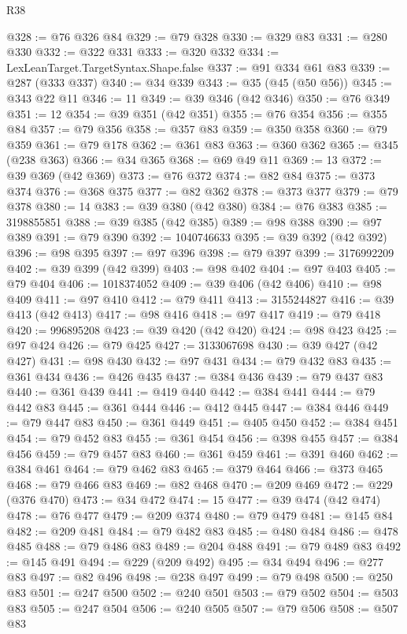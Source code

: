 \begin{lexlean}{R38}
\begin{coremodule}
@328 := @76 @326 @84
@329 := @79 @328
@330 := @329 @83
@331 := @280 @330
@332 := @322 @331
@333 := @320 @332
@334 := LexLeanTarget.TargetSyntax.Shape.false
@337 := @91 @334 @61 @83
@339 := @287 (@333 @337)
@340 := @34 @339
@343 := @35 (@45 (@50 @56))
@345 := @343 @22 @11
@346 := 11
@349 := @39 @346 (@42 @346)
@350 := @76 @349
@351 := 12
@354 := @39 @351 (@42 @351)
@355 := @76 @354
@356 := @355 @84
@357 := @79 @356
@358 := @357 @83
@359 := @350 @358
@360 := @79 @359
@361 := @79 @178
@362 := @361 @83
@363 := @360 @362
@365 := @345 (@238 @363)
@366 := @34 @365
@368 := @69 @49 @11
@369 := 13
@372 := @39 @369 (@42 @369)
@373 := @76 @372
@374 := @82 @84
@375 := @373 @374
@376 := @368 @375
@377 := @82 @362
@378 := @373 @377
@379 := @79 @378
@380 := 14
@383 := @39 @380 (@42 @380)
@384 := @76 @383
@385 := 3198855851
@388 := @39 @385 (@42 @385)
@389 := @98 @388
@390 := @97 @389
@391 := @79 @390
@392 := 1040746633
@395 := @39 @392 (@42 @392)
@396 := @98 @395
@397 := @97 @396
@398 := @79 @397
@399 := 3176992209
@402 := @39 @399 (@42 @399)
@403 := @98 @402
@404 := @97 @403
@405 := @79 @404
@406 := 1018374052
@409 := @39 @406 (@42 @406)
@410 := @98 @409
@411 := @97 @410
@412 := @79 @411
@413 := 3155244827
@416 := @39 @413 (@42 @413)
@417 := @98 @416
@418 := @97 @417
@419 := @79 @418
@420 := 996895208
@423 := @39 @420 (@42 @420)
@424 := @98 @423
@425 := @97 @424
@426 := @79 @425
@427 := 3133067698
@430 := @39 @427 (@42 @427)
@431 := @98 @430
@432 := @97 @431
@434 := @79 @432 @83
@435 := @361 @434
@436 := @426 @435
@437 := @384 @436
@439 := @79 @437 @83
@440 := @361 @439
@441 := @419 @440
@442 := @384 @441
@444 := @79 @442 @83
@445 := @361 @444
@446 := @412 @445
@447 := @384 @446
@449 := @79 @447 @83
@450 := @361 @449
@451 := @405 @450
@452 := @384 @451
@454 := @79 @452 @83
@455 := @361 @454
@456 := @398 @455
@457 := @384 @456
@459 := @79 @457 @83
@460 := @361 @459
@461 := @391 @460
@462 := @384 @461
@464 := @79 @462 @83
@465 := @379 @464
@466 := @373 @465
@468 := @79 @466 @83
@469 := @82 @468
@470 := @209 @469
@472 := @229 (@376 @470)
@473 := @34 @472
@474 := 15
@477 := @39 @474 (@42 @474)
@478 := @76 @477
@479 := @209 @374
@480 := @79 @479
@481 := @145 @84
@482 := @209 @481
@484 := @79 @482 @83
@485 := @480 @484
@486 := @478 @485
@488 := @79 @486 @83
@489 := @204 @488
@491 := @79 @489 @83
@492 := @145 @491
@494 := @229 (@209 @492)
@495 := @34 @494
@496 := @277 @83
@497 := @82 @496
@498 := @238 @497
@499 := @79 @498
@500 := @250 @83
@501 := @247 @500
@502 := @240 @501
@503 := @79 @502
@504 := @503 @83
@505 := @247 @504
@506 := @240 @505
@507 := @79 @506
@508 := @507 @83

\end{coremodule}
\end{lexlean}
